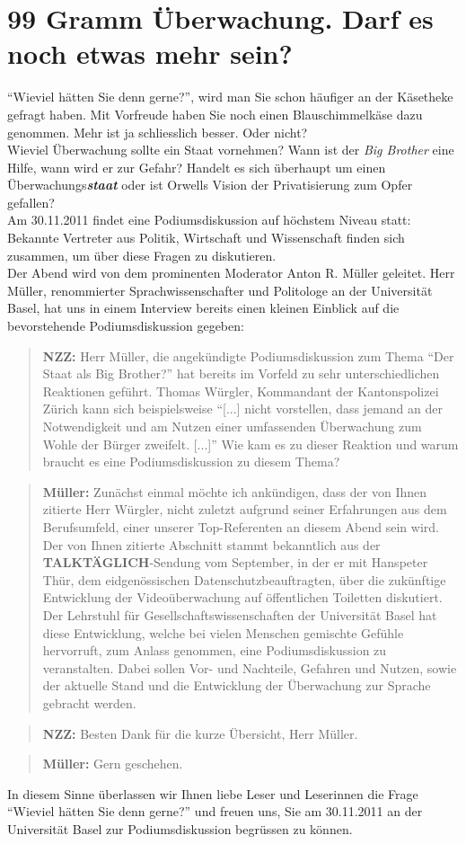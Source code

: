 \section*{99 Gramm Überwachung. Darf es noch etwas mehr sein?}
"`Wieviel hätten Sie denn gerne?"', wird man Sie schon
häufiger an der Käsetheke gefragt haben. Mit Vorfreude haben
Sie noch einen Blauschimmelkäse dazu genommen. Mehr ist ja
schliesslich besser. Oder nicht?\\
Wieviel Überwachung sollte ein Staat vornehmen? Wann ist
der \textit{Big Brother} eine Hilfe, wann wird er zur Gefahr?
Handelt es sich überhaupt um einen Überwachungs\textbf{\textit{staat}}
oder ist Orwells Vision der Privatisierung zum Opfer gefallen?\\
Am 30.11.2011 findet eine Podiumsdiskussion auf höchstem Niveau statt:
Bekannte Vertreter aus Politik, Wirtschaft
und Wissenschaft finden sich zusammen, um über diese Fragen zu diskutieren.\\ 
Der Abend wird von dem prominenten Moderator Anton R. Müller
geleitet. Herr Müller, renommierter Sprachwissenschafter und Politologe
an der Universität Basel, hat uns in
einem Interview bereits einen kleinen Einblick auf die
bevorstehende Podiumsdiskussion gegeben:

\begin{quote}
\textbf{NZZ:} Herr Müller, die angekündigte Podiumsdiskussion zum Thema
"`Der Staat als Big Brother?"' hat bereits im Vorfeld zu
sehr unterschiedlichen Reaktionen geführt. Thomas Würgler, 
Kommandant der Kantonspolizei Zürich kann sich beispielsweise "`[...] nicht
 vorstellen, dass jemand an der Notwendigkeit und am Nutzen
 einer umfassenden Überwachung zum Wohle der Bürger zweifelt. [...]"'
Wie kam es zu dieser Reaktion und warum braucht es eine  
Podiumsdiskussion zu diesem Thema?
\end{quote}
\begin{quote}
\textbf{Müller:} Zunächst einmal möchte ich ankündigen, dass
der von Ihnen zitierte Herr Würgler, nicht zuletzt aufgrund
seiner Erfahrungen aus dem Berufsumfeld, einer unserer Top-Refe\-renten
an diesem Abend sein wird. Der von Ihnen zitierte Abschnitt stammt
bekanntlich aus der \textbf{TALKTÄGLICH}-Sendung vom September,
in der er mit Hanspeter Thür,
dem eidgenössischen Datenschutzbeauftragten, über die zukünftige
Entwicklung der Videoüberwachung auf öffentlichen Toiletten
diskutiert.
Der Lehrstuhl für Gesellschaftswissenschaften der Universität Basel
hat diese Entwicklung, welche bei vielen Menschen gemischte Gefühle
hervorruft, zum Anlass genommen, eine Podiumsdiskussion zu veranstalten.
Dabei sollen Vor- und Nachteile, Gefahren und Nutzen, sowie der aktuelle
 Stand und die Entwicklung der Überwachung zur Sprache gebracht werden.
\end{quote}
\begin{quote}
\textbf{NZZ:} Besten Dank für die kurze Übersicht,
Herr Müller.
\end{quote}
\begin{quote}
\textbf{Müller:} Gern geschehen.
\end{quote}
In diesem Sinne überlassen wir Ihnen liebe Leser und Leserinnen
die Frage "`Wieviel hätten Sie denn gerne?"' und freuen uns, Sie am
30.11.2011 an der Universität Basel zur Podiumsdiskussion
begrüssen zu können.
